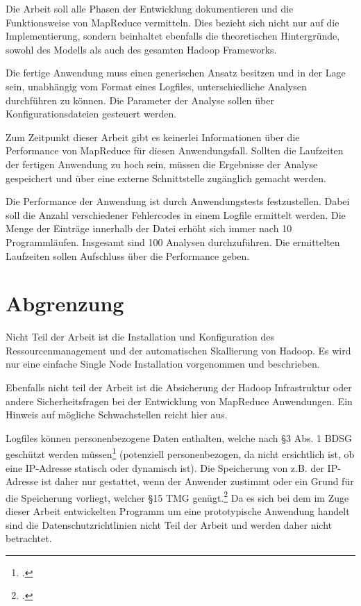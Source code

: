 Die Arbeit soll alle Phasen der Entwicklung dokumentieren und die Funktionsweise von MapReduce vermitteln. Dies bezieht sich nicht nur auf die Implementierung, sondern beinhaltet ebenfalls die theoretischen Hintergründe, sowohl des Modells als auch des gesamten Hadoop Frameworks.

Die fertige Anwendung muss einen generischen Ansatz besitzen und in der Lage sein, unabhängig vom Format eines Logfiles, unterschiedliche Analysen durchführen zu können. Die Parameter der Analyse sollen über Konfigurationsdateien gesteuert werden.

\newpage
Zum Zeitpunkt dieser Arbeit gibt es keinerlei Informationen über die Performance von MapReduce für diesen Anwendungsfall. Sollten die Laufzeiten der fertigen Anwendung zu hoch sein, müssen die Ergebnisse der Analyse gespeichert und über eine externe Schnittstelle zugänglich gemacht werden.

Die Performance der Anwendung ist durch Anwendungstests festzustellen. Dabei soll die Anzahl verschiedener Fehlercodes in einem Logfile ermittelt werden. Die Menge der Einträge innerhalb der Datei erhöht sich immer nach 10 Programmläufen. Insgesamt sind 100 Analysen durchzuführen. Die ermittelten Laufzeiten sollen Aufschluss über die Performance geben.

\section{Abgrenzung}\label{sec:Abgrenzung}
Nicht Teil der Arbeit ist die Installation und Konfiguration des Ressourcenmanagement und der automatischen Skallierung von Hadoop. Es wird nur eine einfache Single Node Installation vorgenommen und beschrieben.

Ebenfalls nicht teil der Arbeit ist die Absicherung der Hadoop Infrastruktur oder andere Sicherheitsfragen bei der Entwicklung von MapReduce Anwendungen. Ein Hinweis auf mögliche Schwachstellen reicht hier aus.

Logfiles können personenbezogene Daten enthalten, welche nach §3 Abs. 1 \ac{BDSG} geschützt werden müssen\footcite[§3 Abs. 1 BDSG,][]{BDSG3.1990} (potenziell personenbezogen, da nicht ersichtlich ist, ob eine \ac{IP}-Adresse statisch oder dynamisch ist). Die Speicherung von z.B. der \ac{IP}-Adresse ist daher nur gestattet, wenn der Anwender zustimmt oder ein Grund für die Speicherung vorliegt, welcher §15 \ac{TMG} genügt.\footcite[§15 TMG,][]{TMG15.2007}  Da es sich bei dem im Zuge dieser Arbeit entwickelten Programm um eine prototypische Anwendung handelt sind die Datenschutzrichtlinien nicht Teil der Arbeit und werden daher nicht betrachtet.


